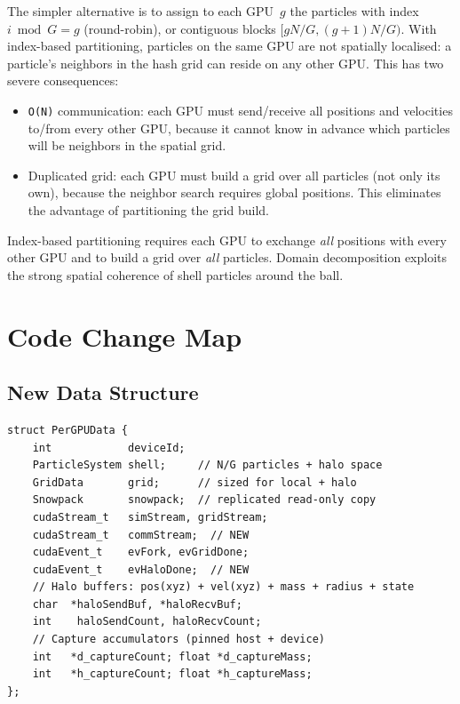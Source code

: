 \documentclass[conference]{IEEEtran}
\begin{document}
The simpler alternative is to assign to each GPU~$g$ the particles with index
$i \bmod G = g$ (round-robin), or contiguous blocks
$[gN/G, (g+1)N/G)$.
With index-based partitioning, particles on the same GPU are not spatially
localised: a particle's neighbors in the hash grid can reside on any other
GPU. This has two severe consequences:
\begin{itemize}
  \item \texttt{O(N)} communication: each GPU must send/receive all positions and velocities
        to/from every other GPU, because it cannot know in advance which particles
        will be neighbors in the spatial grid.
  \item Duplicated grid: each GPU must build a grid over all particles (not only its own),
        because the neighbor search requires global positions. This eliminates the
        advantage of partitioning the grid build.
\end{itemize}

Index-based partitioning requires each GPU to exchange \emph{all} positions
with every other GPU and to build a grid over \emph{all} particles. Domain 
decomposition exploits the strong spatial coherence of shell particles around the ball.

\section{Code Change Map}
\label{sec:code}

\subsection{New Data Structure}

\begin{lstlisting}[caption={Per-GPU state struct}]
struct PerGPUData {
    int            deviceId;
    ParticleSystem shell;     // N/G particles + halo space
    GridData       grid;      // sized for local + halo
    Snowpack       snowpack;  // replicated read-only copy
    cudaStream_t   simStream, gridStream;
    cudaStream_t   commStream;  // NEW
    cudaEvent_t    evFork, evGridDone;
    cudaEvent_t    evHaloDone;  // NEW
    // Halo buffers: pos(xyz) + vel(xyz) + mass + radius + state
    char  *haloSendBuf, *haloRecvBuf;
    int    haloSendCount, haloRecvCount;
    // Capture accumulators (pinned host + device)
    int   *d_captureCount; float *d_captureMass;
    int   *h_captureCount; float *h_captureMass;
};
\end{lstlisting}
\end{document}
